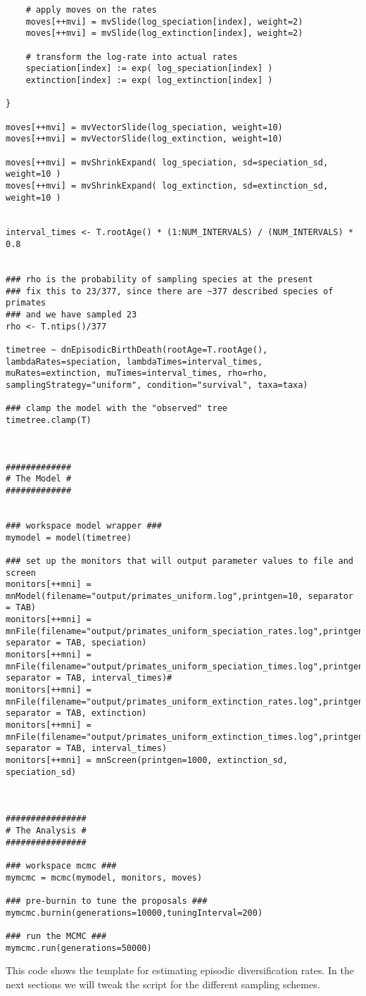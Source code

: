 {\begin{snugshade*}
\begin{lstlisting}
    # apply moves on the rates
    moves[++mvi] = mvSlide(log_speciation[index], weight=2)
    moves[++mvi] = mvSlide(log_extinction[index], weight=2)

    # transform the log-rate into actual rates
    speciation[index] := exp( log_speciation[index] )
    extinction[index] := exp( log_extinction[index] )

}

moves[++mvi] = mvVectorSlide(log_speciation, weight=10)
moves[++mvi] = mvVectorSlide(log_extinction, weight=10)

moves[++mvi] = mvShrinkExpand( log_speciation, sd=speciation_sd, weight=10 )
moves[++mvi] = mvShrinkExpand( log_extinction, sd=extinction_sd, weight=10 )


interval_times <- T.rootAge() * (1:NUM_INTERVALS) / (NUM_INTERVALS) * 0.8


### rho is the probability of sampling species at the present
### fix this to 23/377, since there are ~377 described species of primates
### and we have sampled 23
rho <- T.ntips()/377

timetree ~ dnEpisodicBirthDeath(rootAge=T.rootAge(), lambdaRates=speciation, lambdaTimes=interval_times, muRates=extinction, muTimes=interval_times, rho=rho, samplingStrategy="uniform", condition="survival", taxa=taxa)

### clamp the model with the "observed" tree
timetree.clamp(T)



#############
# The Model #
#############


### workspace model wrapper ###
mymodel = model(timetree)

### set up the monitors that will output parameter values to file and screen 
monitors[++mni] = mnModel(filename="output/primates_uniform.log",printgen=10, separator = TAB)
monitors[++mni] = mnFile(filename="output/primates_uniform_speciation_rates.log",printgen=10, separator = TAB, speciation)
monitors[++mni] = mnFile(filename="output/primates_uniform_speciation_times.log",printgen=10, separator = TAB, interval_times)#
monitors[++mni] = mnFile(filename="output/primates_uniform_extinction_rates.log",printgen=10, separator = TAB, extinction)
monitors[++mni] = mnFile(filename="output/primates_uniform_extinction_times.log",printgen=10, separator = TAB, interval_times)
monitors[++mni] = mnScreen(printgen=1000, extinction_sd, speciation_sd)



################
# The Analysis #
################

### workspace mcmc ###
mymcmc = mcmc(mymodel, monitors, moves)

### pre-burnin to tune the proposals ###
mymcmc.burnin(generations=10000,tuningInterval=200)

### run the MCMC ###
mymcmc.run(generations=50000)
\end{lstlisting}
\end{snugshade*}}
This \Rev code shows the template for estimating episodic diversification rates.
In the next sections we will tweak the script for the different sampling schemes.



